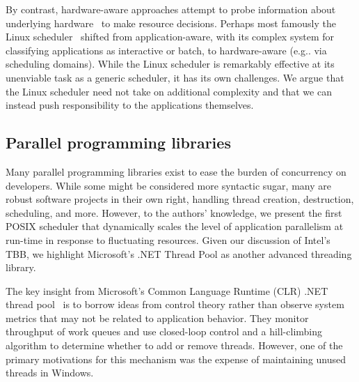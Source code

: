 
By contrast, hardware-aware approaches attempt to probe information about underlying hardware~\cite{blagodurov2010case} \cite{topcuoglu2002performance} to make resource decisions. Perhaps most famously the Linux scheduler~\cite{molnar2007cfs} shifted from application-aware, with its complex system for classifying applications as interactive or batch, to hardware-aware (e.g.. via scheduling domains). While the Linux scheduler is remarkably effective at its unenviable task as a generic scheduler, it has its own challenges\cite{lozi2016linux}. We argue that the Linux scheduler need not take on additional complexity and that we can instead push responsibility to the applications themselves.

\subsection{Parallel programming libraries}
Many parallel programming libraries exist to ease the burden of concurrency on developers. While some might be considered more syntactic sugar, many are robust software projects in their own right, handling thread creation, destruction, scheduling, and more. However, to the authors' knowledge, we present the first POSIX scheduler that dynamically scales the level of application parallelism at run-time in response to fluctuating resources. Given our discussion of Intel's TBB, we highlight Microsoft's .NET Thread Pool as another advanced threading library.

The key insight from Microsoft's Common Language Runtime (CLR) .NET thread pool~\cite{hellerstein2008optimizing}\cite{hellerstein2009configuring} is to borrow ideas from control theory rather than observe system metrics that may not be related to application behavior. They monitor throughput of work queues and use closed-loop control and a hill-climbing algorithm to determine whether to add or remove threads. However, one of the primary motivations for this mechanism was the expense of maintaining unused threads in Windows.

